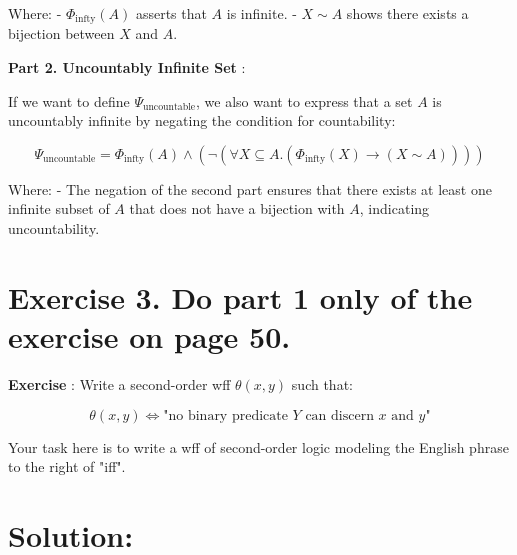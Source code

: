 \documentclass{article}
\begin{document}
\vspace{1em}
Where:
- \( \Phi_{\text{infty}}(A) \) asserts that \( A \) is infinite.
- \( X \sim A \) shows there exists a bijection between \( X \) and \( A \).

\vspace{1em}
\newpage


\textbf{Part 2. Uncountably Infinite Set }:

\vspace{1em}
If we want to define \( \Psi_{\text{uncountable}} \), we also want to express that a set \( A \) is uncountably infinite by negating the condition for countability:

\vspace{1em}
\[
\Psi_{\text{uncountable}} = \Phi_{\text{infty}}(A) \land (\neg (\forall X \subseteq A. (\Phi_{\text{infty}}(X) \rightarrow (X \sim A))))
\]

\vspace{1em}
Where:
- The negation of the second part ensures that there exists at least one infinite subset of \( A \) that does not have a bijection with \( A \), indicating uncountability.

\vspace{1em}

\newpage


\section*{Exercise 3. Do part 1 only of the exercise on page 50.}

\begin{mdframed}
    \vspace{1em}
        \textbf{Exercise }: Write a second-order wff \( \theta(x, y) \) such that:

        \[
        \theta(x, y) \iff \text{"no binary predicate } Y \text{ can discern } x \text{ and } y\text{"}
        \]
        
        Your task here is to write a wff of second-order logic modeling the English phrase to the right of "iff".
        
    \vspace{1em}
\end{mdframed}
    


\section*{Solution:}
\end{document}
